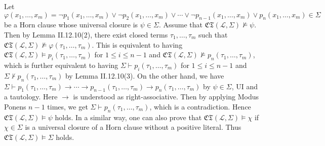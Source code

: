 \documentclass[12pt]{article}
\theoremstyle{definition}
\newenvironment{customthm}[1]
  {\renewcommand\theinnercustomthm{#1}\innercustomthm}
  {\endinnercustomthm}
\begin{document}
\begin{customthm}{II.14.5} Let $\varphi(x_1,\ldots,x_m)=\neg p_1(x_1,\ldots,x_m)\vee\neg p_2(x_1,\ldots,x_m)\vee\cdots\vee\neg p_{n-1}(x_1,\ldots,x_m)\vee p_n(x_1,\ldots,x_m)\in\Sigma$ be a Horn clause whose universal closure is $\psi\in\Sigma$. Assume that $\mathfrak{CT}(\mathcal{L},\Sigma)\not\models\psi$. Then by Lemma II.12.10(2), there exist closed terms $\tau_1,\ldots,\tau_m$ such that $\mathfrak{CT}(\mathcal{L},\Sigma)\not\models\varphi(\tau_1,\ldots,\tau_m)$. This is equivalent to having $\mathfrak{CT}(\mathcal{L},\Sigma)\models p_i(\tau_1,\ldots,\tau_m)$ for $1\leq i\leq n-1$ and $\mathfrak{CT}(\mathcal{L},\Sigma)\not\models p_n(\tau_1,\ldots,\tau_m)$, which is further equivalent to having $\Sigma\vdash p_i(\tau_1,\ldots,\tau_m)$ for $1\leq i\leq n-1$ and $\Sigma\not\vdash p_n(\tau_1,\ldots,\tau_m)$ by Lemma II.12.10(3). On the other hand, we have $\Sigma\vdash p_1(\tau_1,\ldots,\tau_m)\rightarrow\cdots\rightarrow p_{n-1}(\tau_1,\ldots,\tau_m)\rightarrow p_n(\tau_1,\ldots,\tau_m)$ by $\psi\in\Sigma$, UI and a tautology. Here $\rightarrow$ is understood as right-associative. Then by applying Modus Ponens $n-1$ times, we get $\Sigma\vdash p_n(\tau_1,\ldots,\tau_m)$, which is a contradiction. Hence $\mathfrak{CT}(\mathcal{L},\Sigma)\models\psi$ holds. In a similar way, one can also prove that $\mathfrak{CT}(\mathcal{L},\Sigma)\models\chi$ if $\chi\in\Sigma$ is a universal closure of a Horn clause without a positive literal. Thus $\mathfrak{CT}(\mathcal{L},\Sigma)\models\Sigma$ holds.
\end{customthm}
\end{document}
